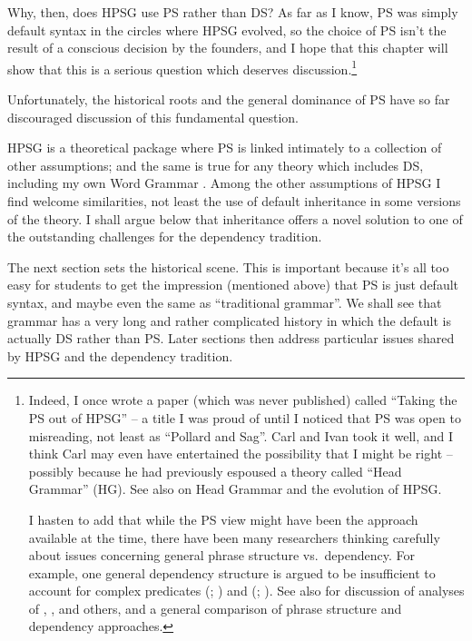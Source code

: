 \documentclass[output=paper
 	        ,biblatex
                ,babelshorthands
                ,newtxmath
                ,draftmode
                ,colorlinks, citecolor=brown
]{langscibook}
\begin{document}
Why, then, does HPSG use PS rather than DS? As far as I know, PS was simply default syntax in the
circles where HPSG evolved, so the choice of PS isn't the result of a conscious decision by the
founders, and I hope that this chapter will show that this is a serious question which deserves
discussion.\footnote{%
  Indeed, I once wrote a paper (which was never published) called ``Taking the PS out of HPSG'' – a
  title I was proud of until I noticed that PS was open to misreading, not least as ``Pollard and
  Sag''. Carl and Ivan took it well, and I think Carl may even have entertained the possibility that
  I might be right – possibly because he had previously espoused a theory called ``Head Grammar''
  (HG). See also  on
    Head Grammar and the evolution of HPSG.

I hasten to add that while the PS view might have been the approach available at the time,
  there have been many researchers thinking carefully about issues concerning general phrase structure
  vs.\ dependency. For example, one general dependency structure is argued to be insufficient to
  account for complex predicates (\citealt{AG2010a-u}; ) and 
  (\citealt{KS2002a}; ). See also  for discussion of analyses of
  \citet{Eroms2000a}, \citet{GO2009a}, and others, and a general comparison of phrase structure and dependency approaches.
}


Unfortunately, the historical roots and the general dominance of PS have so far discouraged discussion of this fundamental question.

\largerpage
HPSG is a theoretical package where PS is linked intimately to a collection of other assumptions;
and the same is true for any theory which includes DS, including my own Word Grammar
\citep{Hudson84a-u,Hudson90a-u,Hudson1998,Hudson2007a-u,Hudson2010b-u,Gisborne2010,GisborneTBA,Duran-Eppler2011,TraugottTrousdale2013}. Among
the other assumptions of HPSG I find welcome similarities, not least the use of default inheritance
in some versions of the theory. I shall argue below that inheritance offers a novel solution to one
of the outstanding challenges for the dependency tradition.

The next section sets the historical scene. This is important because it's all too easy for students
to get the impression (mentioned above) that PS is just default syntax, and maybe even the same as
``traditional grammar''. We shall see that grammar has a very long and rather complicated history in
which the default is actually DS rather than PS. Later sections then address particular issues
shared by HPSG and the dependency tradition.
\end{document}
